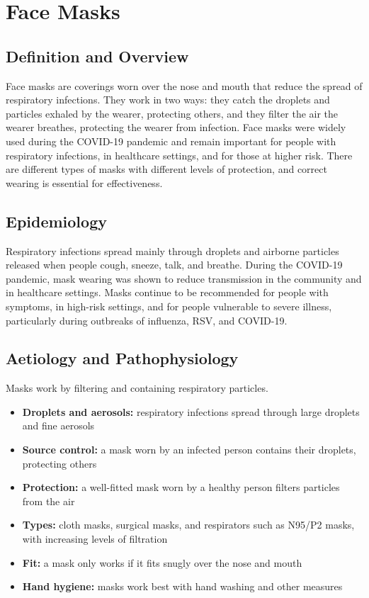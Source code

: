 \chapter{Face Masks}

\section*{Definition and Overview}
Face masks are coverings worn over the nose and mouth that reduce the spread of respiratory infections. They work in two ways: they catch the droplets and particles exhaled by the wearer, protecting others, and they filter the air the wearer breathes, protecting the wearer from infection. Face masks were widely used during the COVID-19 pandemic and remain important for people with respiratory infections, in healthcare settings, and for those at higher risk. There are different types of masks with different levels of protection, and correct wearing is essential for effectiveness.

\section*{Epidemiology}
Respiratory infections spread mainly through droplets and airborne particles released when people cough, sneeze, talk, and breathe. During the COVID-19 pandemic, mask wearing was shown to reduce transmission in the community and in healthcare settings. Masks continue to be recommended for people with symptoms, in high-risk settings, and for people vulnerable to severe illness, particularly during outbreaks of influenza, RSV, and COVID-19.

\section*{Aetiology and Pathophysiology}
Masks work by filtering and containing respiratory particles.
\begin{itemize}
    \item \textbf{Droplets and aerosols:} respiratory infections spread through large droplets and fine aerosols
    \item \textbf{Source control:} a mask worn by an infected person contains their droplets, protecting others
    \item \textbf{Protection:} a well-fitted mask worn by a healthy person filters particles from the air
    \item \textbf{Types:} cloth masks, surgical masks, and respirators such as N95/P2 masks, with increasing levels of filtration
    \item \textbf{Fit:} a mask only works if it fits snugly over the nose and mouth
    \item \textbf{Hand hygiene:} masks work best with hand washing and other measures
\end{itemize}


